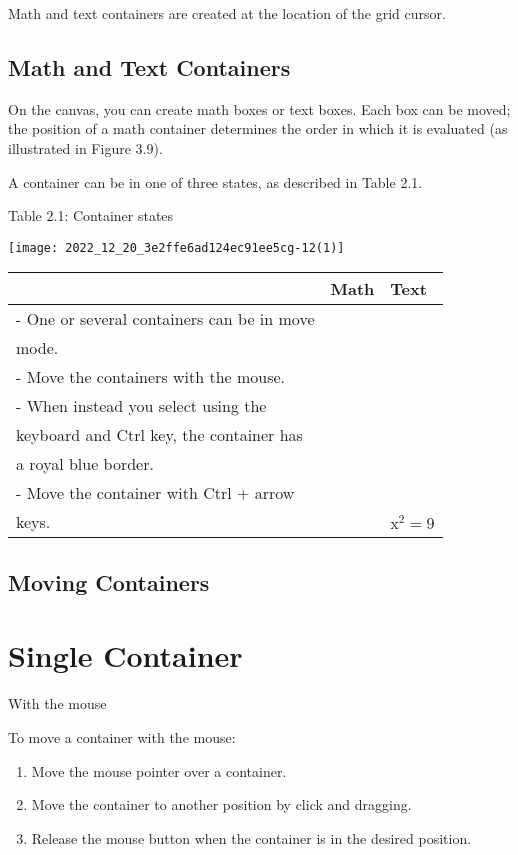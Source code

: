 Math and text containers are created at the location of the grid cursor.

\subsection{Math and Text Containers}
On the canvas, you can create math boxes or text boxes. Each box can be moved; the position of a math container determines the order in which it is evaluated (as illustrated in Figure 3.9).

A container can be in one of three states, as described in Table 2.1.

Table 2.1: Container states

\begin{center}
\texttt{[image: 2022\_12\_20\_3e2ffe6ad124ec91ee5cg-12(1)]}
\end{center}

\begin{center}
\begin{tabular}{|l|l|l|}
\hline
 & Math & Text \\
\hline
- One or several containers can be in move &  &  \\
mode. &  &  \\
- Move the containers with the mouse. &  &  \\
- When instead you select using the &  &  \\
keyboard and Ctrl key, the container has &  &  \\
a royal blue border. &  &  \\
- Move the container with Ctrl + arrow &  &  \\
keys. &  & $\mathrm{x}^{2}=9$ \\
\hline
\end{tabular}
\end{center}

\subsection{Moving Containers}
\section{Single Container}
With the mouse

To move a container with the mouse:

\begin{enumerate}
  \item Move the mouse pointer over a container.

  \item Move the container to another position by click and dragging.

  \item Release the mouse button when the container is in the desired position.

\end{enumerate}

